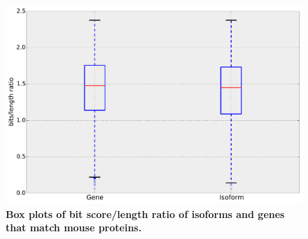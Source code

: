 \documentclass[10pt]{article}
\begin{document}
\begin{figure}[!ht]
\begin{center}
\includegraphics[width=5in]{mouse-homolog-boxplot.pdf}
\end{center}
\caption{
{\bf Box plots of bit score/length ratio of isoforms and genes that match mouse
proteins.}
}
\label{bitscore}
\end{figure}

% 
\end{document}
